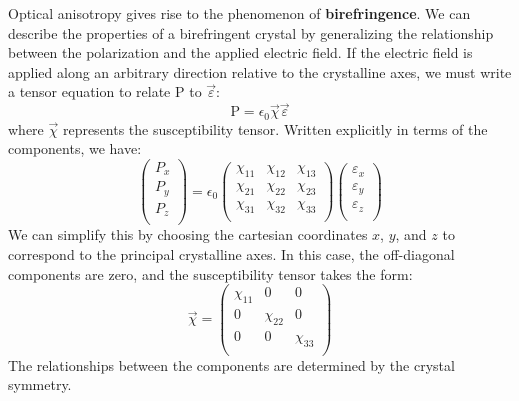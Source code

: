 \documentclass[12pt]{book}
\begin{document}
Optical anisotropy gives rise to the phenomenon of \textbf{birefringence}. We can describe the properties of a birefringent crystal by generalizing the relationship between the polarization and the applied electric field. If the electric field is applied along an arbitrary direction relative to the crystalline axes, we must write a tensor equation to relate $\mathrm{P}$ to $\vec{\varepsilon}$:
\begin{equation}\label{equa:2.40}
  \mathrm{P}=\epsilon_0\vec{\chi}\vec{\varepsilon}
\end{equation}
where $\vec{\chi}$ represents the susceptibility tensor. Written explicitly in terms of the components, we have:
\begin{equation}\label{equa:2.41}
\left(  \begin{array}{c}
    P_x \\
    P_y \\
    P_z \\
  \end{array}
\right)=\epsilon_0\left(
                    \begin{array}{ccc}
                      \chi_{11} & \chi_{12} & \chi_{13} \\
                      \chi_{21} & \chi_{22} & \chi_{23} \\
                      \chi_{31} & \chi_{32} & \chi_{33} \\
                    \end{array}
                  \right)\left(
                           \begin{array}{c}
                             \varepsilon_x \\
                             \varepsilon_y \\
                             \varepsilon_z \\
                           \end{array}
                         \right)
                         \end{equation}
We can simplify this by choosing the cartesian coordinates $x$, $y$, and $z$ to correspond to the principal crystalline axes. In this case, the off-diagonal components are zero, and the susceptibility tensor takes the form:
\begin{equation}\label{equa:2.42}
  \vec{\chi}=\left(
                  \begin{array}{ccc}
                    \chi_{11} & 0 & 0 \\
                    0 & \chi_{22} & 0 \\
                    0 & 0 & \chi_{33} \\
                  \end{array}
                \right)
\end{equation}
The relationships between the components are determined by the crystal symmetry.
\end{document}
